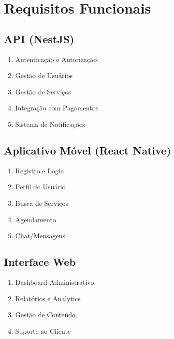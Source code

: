 \section{Requisitos Funcionais}
\subsection{API (NestJS)}
\begin{enumerate}[label=RF-API.\arabic*]
    \item Autenticação e Autorização
    \item Gestão de Usuários
    \item Gestão de Serviços
    \item Integração com Pagamentos
    \item Sistema de Notificações
\end{enumerate}

\subsection{Aplicativo Móvel (React Native)}
\begin{enumerate}[label=RF-MOB.\arabic*]
    \item Registro e Login
    \item Perfil do Usuário
    \item Busca de Serviços
    \item Agendamento
    \item Chat/Mensagens
\end{enumerate}

\subsection{Interface Web}
\begin{enumerate}[label=RF-WEB.\arabic*]
    \item Dashboard Administrativo
    \item Relatórios e Analytics
    \item Gestão de Conteúdo
    \item Suporte ao Cliente
\end{enumerate} 